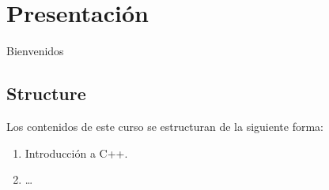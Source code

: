 \chapter*{Presentación}

Bienvenidos


\section*{Structure}

Los contenidos de este curso se estructuran de la siguiente forma:

\begin{enumerate}

\item Introducción a C++.
\item \ldots

\end{enumerate}
